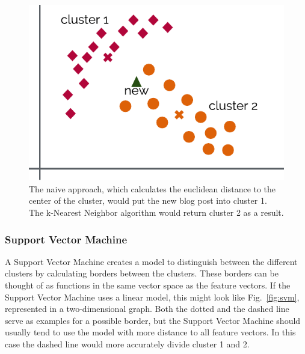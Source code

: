 \begin{figure}
    \centering
    \includegraphics[]{images/naive.pdf}
    \caption{The naive approach, which calculates the euclidean distance to the center of the cluster, would put the new blog post into cluster 1. The k-Nearest Neighbor algorithm would return cluster 2 as a result.}
    \label{fig:naive}
\end{figure}


\subsubsection{Support Vector Machine}
\label{sec:support_vector_machine}


A Support Vector Machine creates a model to distinguish between the different clusters by calculating borders between the clusters.
These borders can be thought of as functions in the same vector space as the feature vectors.
If the Support Vector Machine uses a linear model, this might look like Fig.~\ref{fig:svm}, represented in a two-dimensional graph.
Both the dotted and the dashed line serve as examples for a possible border, but the Support Vector Machine should usually tend to use the model with more distance to all feature vectors.
In this case the dashed line would more accurately divide cluster 1 and 2.


